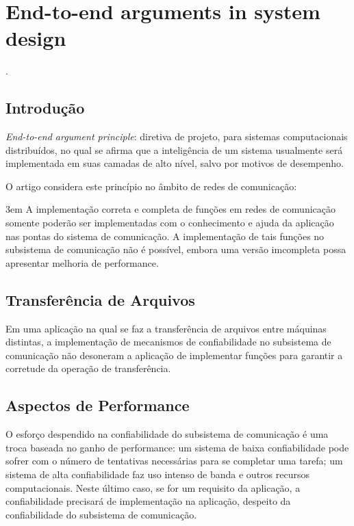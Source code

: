 
\chapter{End-to-end arguments in system design}

 \cite{saltzer1984end}.


\section*{Introdução}

\emph{End-to-end argument principle}: diretiva de projeto, para sistemas computacionais distribuídos, no qual se afirma que a inteligência de um sistema usualmente será implementada em suas camadas de alto nível, salvo por motivos de desempenho.

O artigo considera este princípio no âmbito de redes de comunicação:
\setlength{\parskip}{8pt}

\hangindent3em
A implementação correta e completa de funções em redes de comunicação somente poderão ser implementadas com o conhecimento e ajuda da aplicação nas pontas do sistema de comunicação. A implementação de tais funções no subsistema de comunicação não é possível, embora uma versão imcompleta possa apresentar melhoria de performance.


\setlength\parskip{15pt}
\section*{Transferência de Arquivos}

Em uma aplicação na qual se faz a transferência de arquivos entre máquinas distintas, a implementação de mecanismos de confiabilidade no subsistema de comunicação não desoneram a aplicação de implementar funções para garantir a corretude da operação de transferência.


\section*{Aspectos de Performance}

O esforço despendido na confiabilidade do subsistema de comunicação é uma troca baseada no ganho de performance: um sistema de baixa confiabilidade pode sofrer com o número de tentativas necessárias para se completar uma tarefa; um sistema de alta confiabilidade faz uso intenso de banda e outros recursos computacionais. Neste último caso, se for um requisito da aplicação, a confiabilidade precisará de implementação na aplicação, despeito da confiabilidade do subsistema de comunicação.

